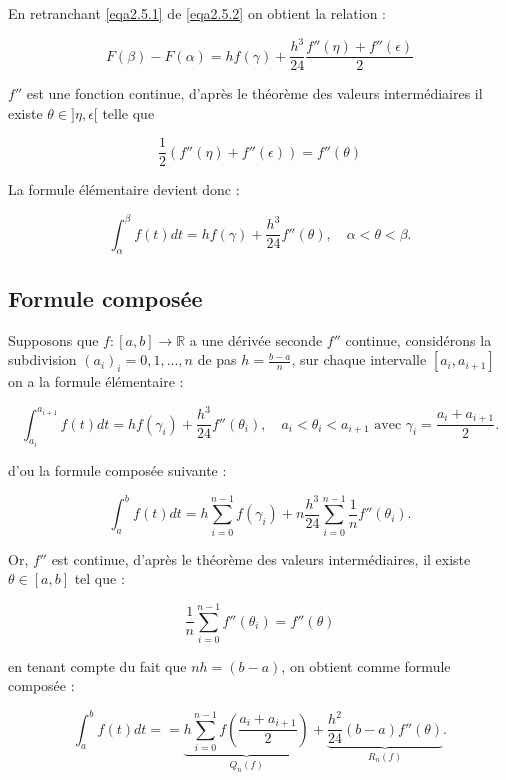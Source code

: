 En retranchant \eqref{eqa2.5.1} de \eqref{eqa2.5.2} on obtient la relation :

\[
F(\beta) - F(\alpha) = hf(\gamma) + \frac{h^3}{24} \frac{f''(\eta) + f''(\epsilon)}{2}
\]

\( f'' \) est une fonction continue, d'après le théorème des valeurs intermédiaires il existe \( \theta \in ]\eta,\epsilon[ \) telle que 

\[
\frac{1}{2}(f''(\eta) + f''(\epsilon)) = f''(\theta)
\]

La formule élémentaire devient donc :

\[
\displaystyle\int_{\alpha}^{\beta} f(t)dt = hf(\gamma) + \frac{h^3}{24} f''(\theta), \quad \alpha < \theta < \beta.
\]

\subsection{Formule composée}
Supposons que \( f : [a,b] \rightarrow \mathbb{R} \) a une dérivée seconde \( f'' \) continue, considérons la subdivision \((a_i)_i=0,1,...,n\) de pas \( h = \frac{b-a}{n} \), sur chaque intervalle \([a_i,a_{i+1}]\) on a la formule élémentaire :

\[
\displaystyle\int_{a_i}^{a_{i+1}} f(t)dt = hf(\gamma_i) + \frac{h^3}{24} f''(\theta_i), \quad a_i < \theta_i < a_{i+1} \text{ avec } \gamma_i = \frac{a_i + a_{i+1}}{2}.
\]

d'ou la formule composée suivante :

\[
\displaystyle\int_a^b f(t)dt = h \displaystyle\sum_{i=0}^{n-1} f(\gamma_i) + n \frac{h^3}{24} \displaystyle\sum_{i=0}^{n-1} \frac{1}{n} f''(\theta_i).
\]

Or, \( f'' \) est continue, d'après le théorème des valeurs intermédiaires, il existe \( \theta \in [a,b] \) tel que :

\[
\frac{1}{n} \displaystyle\sum_{i=0}^{n-1} f''(\theta_i) = f''(\theta)
\]

en tenant compte du fait que \( nh = (b-a) \), on obtient comme formule composée :

\[
\displaystyle\int_a^b f(t)dt = = \underbrace{h \sum_{i=0}^{n-1} f\left(\dfrac{a_i+a_{i+1}}{2}\right)}_{Q_n(f)} + \underbrace{\dfrac{h^2}{24}(b-a)f''(\theta)}_{R_n(f)}.
\]

